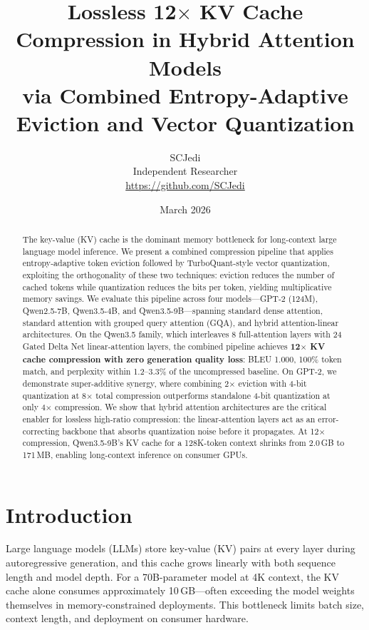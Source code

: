\documentclass[11pt]{article}
\title{Lossless 12$\times$ KV Cache Compression in Hybrid Attention Models\\via Combined Entropy-Adaptive Eviction and Vector Quantization}
\author{
SCJedi\\
Independent Researcher\\
\url{https://github.com/SCJedi}
}
\date{March 2026}
\begin{document}
\maketitle

\begin{abstract}
The key-value (KV) cache is the dominant memory bottleneck for long-context large language model inference.  We present a combined compression pipeline that applies entropy-adaptive token eviction followed by TurboQuant-style vector quantization, exploiting the orthogonality of these two techniques: eviction reduces the number of cached tokens while quantization reduces the bits per token, yielding multiplicative memory savings.  We evaluate this pipeline across four models---GPT-2 (124M), Qwen2.5-7B, Qwen3.5-4B, and Qwen3.5-9B---spanning standard dense attention, standard attention with grouped query attention (GQA), and hybrid attention-linear architectures.  On the Qwen3.5 family, which interleaves 8 full-attention layers with 24 Gated Delta Net linear-attention layers, the combined pipeline achieves \textbf{12$\times$ KV cache compression with zero generation quality loss}: BLEU 1.000, 100\% token match, and perplexity within 1.2--3.3\% of the uncompressed baseline.  On GPT-2, we demonstrate super-additive synergy, where combining 2$\times$ eviction with 4-bit quantization at 8$\times$ total compression outperforms standalone 4-bit quantization at only 4$\times$ compression.  We show that hybrid attention architectures are the critical enabler for lossless high-ratio compression: the linear-attention layers act as an error-correcting backbone that absorbs quantization noise before it propagates.  At 12$\times$ compression, Qwen3.5-9B's KV cache for a 128K-token context shrinks from 2.0\,GB to 171\,MB, enabling long-context inference on consumer GPUs.
\end{abstract}

\section{Introduction}
\label{sec:intro}

Large language models (LLMs) store key-value (KV) pairs at every layer during autoregressive generation, and this cache grows linearly with both sequence length and model depth.  For a 70B-parameter model at 4K context, the KV cache alone consumes approximately 10\,GB---often exceeding the model weights themselves in memory-constrained deployments.  This bottleneck limits batch size, context length, and deployment on consumer hardware.
\end{document}
